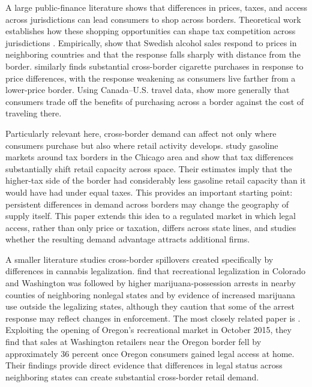 \documentclass[12pt]{article}
\begin{document}
A large public-finance literature shows that differences in prices, taxes, and access across jurisdictions can lead consumers to shop across borders.
Theoretical work establishes how these shopping opportunities can shape tax competition across jurisdictions \cite{KanburKeen1993}. Empirically, \cite{AsplundFribergWilander2007} show that Swedish alcohol sales respond to prices in neighboring countries and that the response falls sharply with distance from the border. \cite{Lovenheim2008} similarly finds substantial cross-border cigarette purchases in response to price differences, with the response weakening as consumers live farther from a lower-price border. Using Canada--U.S. travel data, \cite{ChandraHeadTappata2014} show more generally that consumers trade off the benefits of purchasing across a border against the cost of traveling there.

Particularly relevant here, cross-border demand can affect not only where consumers purchase but also where retail activity develops. \cite{ManuszakMoul2009} study gasoline markets around tax borders in the Chicago area and show that tax differences substantially shift retail capacity across space. Their estimates imply that the higher-tax side of the border had considerably less gasoline retail capacity than it would have had under equal taxes. This provides an important starting point: persistent differences in demand across borders may change the geography of supply itself. This paper extends this idea to a regulated market in which legal access, rather than only price or taxation, differs across state lines, and studies whether the resulting demand advantage attracts additional firms.

A smaller literature studies cross-border spillovers created specifically by differences in cannabis legalization. \cite{HaoCowan2020} find that recreational legalization in Colorado and Washington was followed by higher marijuana-possession arrests in nearby counties of neighboring nonlegal states and by evidence of increased marijuana use outside the legalizing states, although they caution that some of the arrest response may reflect changes in enforcement. The most closely related paper is \cite{HansenMillerWeber2020}. Exploiting the opening of Oregon's recreational market in October 2015, they find that sales at Washington retailers near the Oregon border fell by approximately 36 percent once Oregon consumers gained legal access at home. Their findings provide direct evidence that differences in legal status across neighboring states can create substantial cross-border retail demand.
\end{document}
